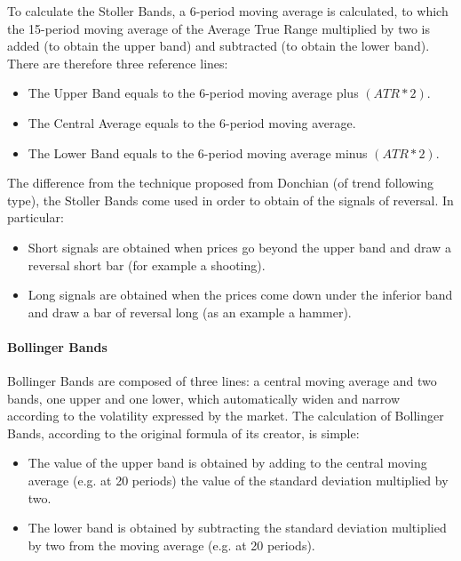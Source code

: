 To calculate the Stoller Bands, a 6-period moving average is calculated, to which the 15-period moving average of the Average True Range multiplied by two is added (to obtain the upper band) and subtracted (to obtain the lower band).
There are therefore three reference lines:

\begin{itemize}
\setlength\itemsep{0.3em}
\item The Upper Band equals to the 6-period moving average plus $(ATR*2)$.
\item The Central Average equals to the 6-period moving average.
\item The Lower Band equals to the 6-period moving average minus $(ATR*2)$.
\end{itemize}  


The difference from the technique proposed from Donchian (of trend following type), the Stoller Bands come used in order to obtain of the signals of reversal. In particular:

\begin{itemize}
\setlength\itemsep{0.3em}
\item Short signals are obtained when prices go beyond the upper band and draw a reversal short bar (for example a shooting).
\item Long signals are obtained when the prices come down under the inferior band and draw a bar of reversal long (as an example a hammer).
\end{itemize} 

\paragraph{\textbf{Bollinger Bands}}\mbox{}

Bollinger Bands are composed of three lines: a central moving average and two bands, one upper and one lower, which automatically widen and narrow according to the volatility expressed by the market. The calculation of Bollinger Bands, according to the original formula of its creator, is simple: 

\begin{itemize}
\setlength\itemsep{0.3em}
\item The value of the upper band is obtained by adding to the central moving average (e.g. at 20 periods) the value of the standard deviation multiplied by two. 
\item The lower band is obtained by subtracting the standard deviation multiplied by two from the moving average (e.g. at 20 periods). 
\end{itemize} 

